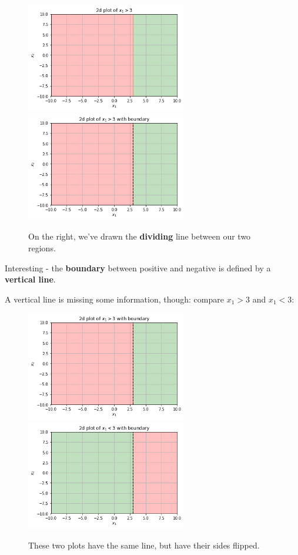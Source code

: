         \begin{figure}[H]
                \includegraphics[width=70mm,scale=0.5]{images/classification_images/x1_2d_plot.png}
                \includegraphics[width=70mm,scale=0.5]{images/classification_images/x1_2d_plot_boundary.png}
                
                \caption*{On the right, we've drawn the \textbf{dividing} line between our two regions.}
        \end{figure}
        
        Interesting - the \textbf{boundary} between positive and negative is defined by a \textbf{vertical line}.
        
        A vertical line is missing some information, though: compare $x_1>3$ and $x_1<3$:
        
        \begin{figure}[H]
                \includegraphics[width=70mm,scale=0.5]{images/classification_images/x1_2d_plot_boundary.png}
                \includegraphics[width=70mm,scale=0.5]{images/classification_images/x1_2d_plot_boundary_reversed.png}
                
                \caption*{These two plots have the same line, but have their sides flipped.}
        \end{figure}
        
